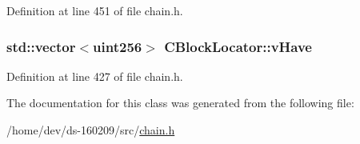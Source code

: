 Definition at line 451 of file chain.\+h.

\hypertarget{class_c_block_locator_a745204ecd8c9326b43ac54d7f780534f}{}
\subsubsection[{v\+Have}]{\setlength{\rightskip}{0pt plus 5cm}std\+::vector$<${\bf uint256}$>$ C\+Block\+Locator\+::v\+Have\hspace{0.3cm}{\ttfamily [protected]}}\label{class_c_block_locator_a745204ecd8c9326b43ac54d7f780534f}


Definition at line 427 of file chain.\+h.



The documentation for this class was generated from the following file\+:\begin{DoxyCompactItemize}
\item 
/home/dev/ds-\/160209/src/\hyperlink{chain_8h}{chain.\+h}\end{DoxyCompactItemize}
